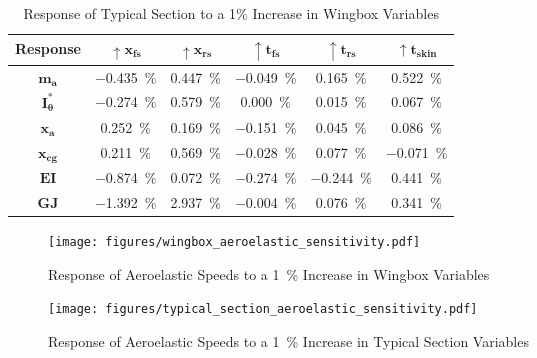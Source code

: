 \begin{table}[H]
    \centering
    \caption{Response of Typical Section to a 1\% Increase in Wingbox Variables}
    \label{tab:wingbox_ts_sensitivity}
    \begin{tabularx}{\textwidth}{CCCCCC} %
    \toprule
    \textbf{Response} & $\uparrow\bm{x_{fs}}$ & $\uparrow\bm{x_{rs}}$ & $\uparrow\bm{t_{fs}}$ &
    $\uparrow\bm{t_{rs}}$ & $\uparrow\bm{t_{skin}}$ \\
    \midrule
    $\bm{m_a}$ &
    \SI{-0.435}{\percent} &
    \SI{0.447}{\percent} &
    \SI{-0.049}{\percent} &
    \SI{0.165}{\percent} &
    \SI{0.522}{\percent} \\
    $\bm{I_\theta^*}$ &
    \SI{-0.274}{\percent} &
    \SI{0.579}{\percent} &
    \SI{0.000}{\percent} &
    \SI{0.015}{\percent} &
    \SI{0.067}{\percent} \\
    $\bm{x_a}$ &
    \SI{0.252}{\percent} &
    \SI{0.169}{\percent} &
    \SI{-0.151}{\percent} &
    \SI{0.045}{\percent} &
    \SI{0.086}{\percent} \\
    $\bm{x_{cg}}$ &
    \SI{0.211}{\percent} &
    \SI{0.569}{\percent} &
    \SI{-0.028}{\percent} &
    \SI{0.077}{\percent} &
    \SI{-0.071}{\percent} \\
    $\bm{EI}$ &
    \SI{-0.874}{\percent} &
    \SI{0.072}{\percent} &
    \SI{-0.274}{\percent} &
    \SI{-0.244}{\percent} &
    \SI{0.441}{\percent} \\
    $\bm{GJ}$ &
    \SI{-1.392}{\percent} &
    \SI{2.937}{\percent} &
    \SI{-0.004}{\percent} &
    \SI{0.076}{\percent} &
    \SI{0.341}{\percent} \\ \bottomrule
    \end{tabularx}
\end{table}

\begin{figure}[H]
    \centering
    \texttt{[image: figures/wingbox\_aeroelastic\_sensitivity.pdf]}
    \caption{Response of Aeroelastic Speeds to a \SI{1}{\percent} Increase in
    Wingbox Variables}
    \label{fig:wingbox_aero_sens}
\end{figure}

\begin{figure}[H]
    \centering
    \texttt{[image: figures/typical\_section\_aeroelastic\_sensitivity.pdf]}
    \caption{Response of Aeroelastic Speeds to a \SI{1}{\percent} Increase in
    Typical Section Variables}
    \label{fig:ts_aero_sens}
\end{figure}

